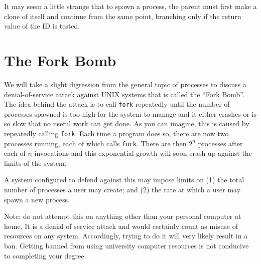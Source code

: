 It may seem a little strange that to spawn a process, the parent must first make a clone of itself and continue from the same point, branching only if the return value of the ID is tested.

\section*{The Fork Bomb}

We will take a slight digression from the general topic of processes to discuss a denial-of-service attack against UNIX systems that is called the ``Fork Bomb''. The idea behind the attack is to call \texttt{fork} repeatedly until the number of processes spawned is too high for the system to manage and it either crashes or is so slow that no useful work can get done. As you can imagine, this is caused by repeatedly calling \texttt{fork}. Each time a program does so, there are now two processes running, each of which calls \texttt{fork}. There are then $2^{n}$ processes after each of $n$ invocations and this exponential growth will soon crash up against the limits of the system.

A system configured to defend against this may impose limits on (1) the total number of processes a user may create; and (2) the rate at which a user may spawn a new process.

Note: do not attempt this on anything other than your personal computer at home. It is a denial of service attack and would certainly count as misuse of resources on any system. Accordingly, trying to do it will very likely result in a ban. Getting banned from using university computer resources is not conducive to completing your degree.



